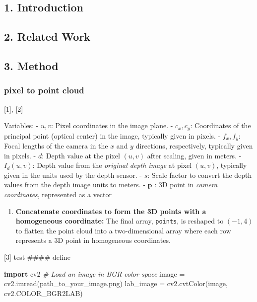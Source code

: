 \documentclass[
]{article}
\author{}
\date{}
\newenvironment{Shaded}{}{}
\newcommand{\CommentTok}[1]{\textcolor[rgb]{0.38,0.63,0.69}{\textit{#1}}}
\newcommand{\ImportTok}[1]{\textcolor[rgb]{0.00,0.50,0.00}{\textbf{#1}}}
\newcommand{\NormalTok}[1]{#1}
\newcommand{\OperatorTok}[1]{\textcolor[rgb]{0.40,0.40,0.40}{#1}}
\newcommand{\StringTok}[1]{\textcolor[rgb]{0.25,0.44,0.63}{#1}}
\providecommand{\tightlist}{%
  \setlength{\itemsep}{0pt}\setlength{\parskip}{0pt}}
\begin{document}
\subsection{1. Introduction}\label{introduction}

\subsection{2. Related Work}\label{related-work}

\subsection{3. Method}\label{method}

\subsubsection{pixel to point cloud}\label{pixel-to-point-cloud}

{[}1{]}, {[}2{]}

Variables: - \(u, v\): Pixel coordinates in the image plane. -
\(c_x, c_y\): Coordinates of the principal point (optical center) in the
image, typically given in pixels. - \(f_x, f_y\): Focal lengths of the
camera in the \(x\) and \(y\) directions, respectively, typically given
in pixels. - \(d\): Depth value at the pixel \((u, v)\) after scaling,
given in meters. - \(I_d(u, v)\): Depth value from the \emph{original
depth image} at pixel \((u, v)\), typically given in the units used by
the depth sensor. - \(s\): Scale factor to convert the depth values from
the depth image units to meters. - \(\mathbf{p}\) : 3D point in
\emph{camera coordinates}, represented as a vector

\begin{enumerate}
\def\labelenumi{\arabic{enumi}.}
\setcounter{enumi}{4}
\tightlist
\item
  \textbf{Concatenate coordinates to form the 3D points with a
  homogeneous coordinate:} The final array, \texttt{points}, is reshaped
  to \((-1, 4)\) to flatten the point cloud into a two-dimensional array
  where each row represents a 3D point in homogeneous coordinates.
\end{enumerate}

{[}3{]} test \#\#\#\# define

\begin{Shaded}
\begin{Highlighting}[]
\ImportTok{import}\NormalTok{ cv2}
\CommentTok{\# Load an image in BGR color space}
\NormalTok{image }\OperatorTok{=}\NormalTok{ cv2.imread(}\StringTok{\textquotesingle{}path\_to\_your\_image.png\textquotesingle{}}\NormalTok{)}
\NormalTok{lab\_image }\OperatorTok{=}\NormalTok{ cv2.cvtColor(image, cv2.COLOR\_BGR2LAB)}
\end{Highlighting}
\end{Shaded}
\end{document}
